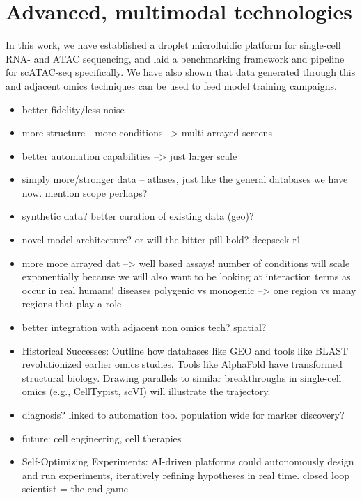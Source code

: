 \chapter{Advanced, multimodal technologies}
In this work, we have established a droplet microfluidic platform for single-cell RNA- and ATAC sequencing, and laid a benchmarking framework and pipeline for scATAC-seq specifically. We have also shown that data generated through this and adjacent omics techniques can be used to feed model training campaigns. 

\begin{itemize}[noitemsep]
    \item better fidelity/less noise
    \item more structure - more conditions --> multi arrayed screens
    \item better automation capabilities --> just larger scale
    \item simply more/stronger data -- atlases, just like the general databases we have now. mention scope perhaps?
    \item synthetic data? better curation of existing data (geo)?
    \item novel model architecture? or will the bitter pill hold? deepseek r1
    \item more more arrayed dat --> well based assays! number of conditions will scale exponentially because we will also want to be looking at interaction terms as occur in real humans! diseases polygenic vs monogenic --> one region vs many regions that play a role
    \item better integration with adjacent non omics tech? spatial?
    \item Historical Successes: Outline how databases like GEO and tools like BLAST revolutionized earlier omics studies. Tools like AlphaFold have transformed structural biology. Drawing parallels to similar breakthroughs in single-cell omics (e.g., CellTypist, scVI) will illustrate the trajectory.
    \item diagnosis? linked to automation too. population wide for marker discovery?
    \item future: cell engineering, cell therapies
    \item Self-Optimizing Experiments: AI-driven platforms could autonomously design and run experiments, iteratively refining hypotheses in real time. closed loop scientist = the end game
\end{itemize}

